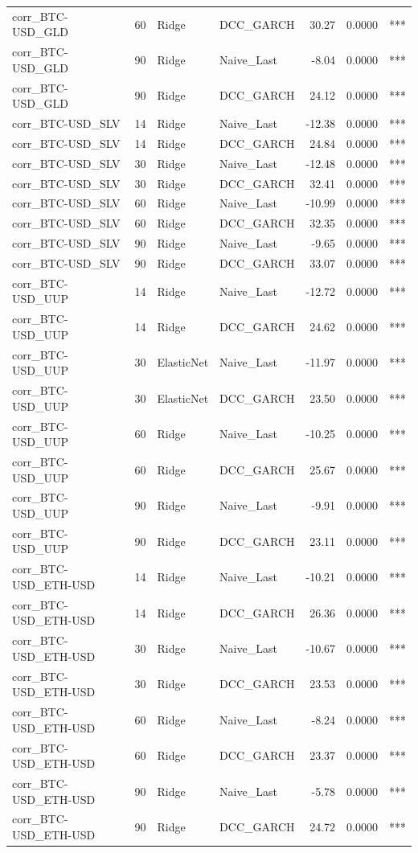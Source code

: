 \begin{table}[H]
\begin{tabular}{llllrrl}
corr_BTC-USD_GLD & 60 & Ridge & DCC_GARCH & 30.27 & 0.0000 & *** \\
corr_BTC-USD_GLD & 90 & Ridge & Naive_Last & -8.04 & 0.0000 & *** \\
corr_BTC-USD_GLD & 90 & Ridge & DCC_GARCH & 24.12 & 0.0000 & *** \\
corr_BTC-USD_SLV & 14 & Ridge & Naive_Last & -12.38 & 0.0000 & *** \\
corr_BTC-USD_SLV & 14 & Ridge & DCC_GARCH & 24.84 & 0.0000 & *** \\
corr_BTC-USD_SLV & 30 & Ridge & Naive_Last & -12.48 & 0.0000 & *** \\
corr_BTC-USD_SLV & 30 & Ridge & DCC_GARCH & 32.41 & 0.0000 & *** \\
corr_BTC-USD_SLV & 60 & Ridge & Naive_Last & -10.99 & 0.0000 & *** \\
corr_BTC-USD_SLV & 60 & Ridge & DCC_GARCH & 32.35 & 0.0000 & *** \\
corr_BTC-USD_SLV & 90 & Ridge & Naive_Last & -9.65 & 0.0000 & *** \\
corr_BTC-USD_SLV & 90 & Ridge & DCC_GARCH & 33.07 & 0.0000 & *** \\
corr_BTC-USD_UUP & 14 & Ridge & Naive_Last & -12.72 & 0.0000 & *** \\
corr_BTC-USD_UUP & 14 & Ridge & DCC_GARCH & 24.62 & 0.0000 & *** \\
corr_BTC-USD_UUP & 30 & ElasticNet & Naive_Last & -11.97 & 0.0000 & *** \\
corr_BTC-USD_UUP & 30 & ElasticNet & DCC_GARCH & 23.50 & 0.0000 & *** \\
corr_BTC-USD_UUP & 60 & Ridge & Naive_Last & -10.25 & 0.0000 & *** \\
corr_BTC-USD_UUP & 60 & Ridge & DCC_GARCH & 25.67 & 0.0000 & *** \\
corr_BTC-USD_UUP & 90 & Ridge & Naive_Last & -9.91 & 0.0000 & *** \\
corr_BTC-USD_UUP & 90 & Ridge & DCC_GARCH & 23.11 & 0.0000 & *** \\
corr_BTC-USD_ETH-USD & 14 & Ridge & Naive_Last & -10.21 & 0.0000 & *** \\
corr_BTC-USD_ETH-USD & 14 & Ridge & DCC_GARCH & 26.36 & 0.0000 & *** \\
corr_BTC-USD_ETH-USD & 30 & Ridge & Naive_Last & -10.67 & 0.0000 & *** \\
corr_BTC-USD_ETH-USD & 30 & Ridge & DCC_GARCH & 23.53 & 0.0000 & *** \\
corr_BTC-USD_ETH-USD & 60 & Ridge & Naive_Last & -8.24 & 0.0000 & *** \\
corr_BTC-USD_ETH-USD & 60 & Ridge & DCC_GARCH & 23.37 & 0.0000 & *** \\
corr_BTC-USD_ETH-USD & 90 & Ridge & Naive_Last & -5.78 & 0.0000 & *** \\
corr_BTC-USD_ETH-USD & 90 & Ridge & DCC_GARCH & 24.72 & 0.0000 & *** \\
\bottomrule
\end{tabular}
\end{table}